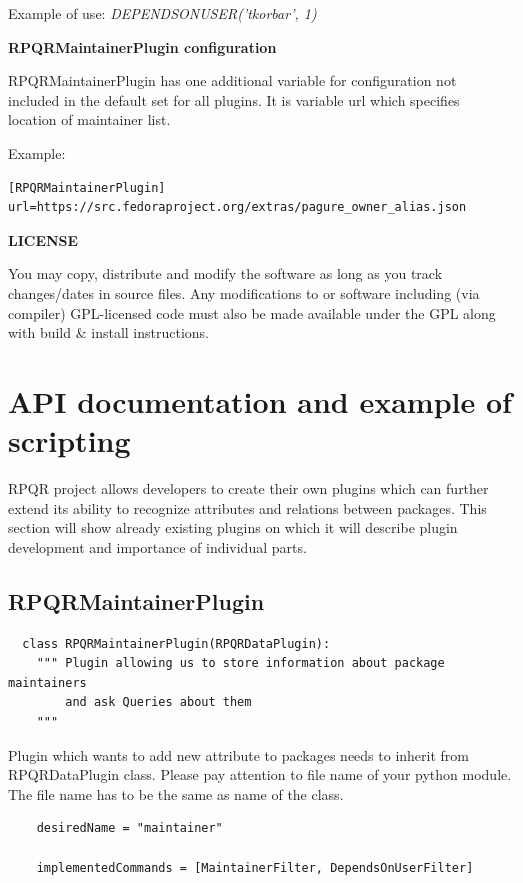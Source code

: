 Example of use: \textit{DEPENDSONUSER('tkorbar', 1)}

\textbf{RPQRMaintainerPlugin configuration}

RPQRMaintainerPlugin has one additional variable for configuration not included in the default set for
all plugins. It is variable url which specifies location of maintainer list.

Example:
\begin{lstlisting}
[RPQRMaintainerPlugin]
url=https://src.fedoraproject.org/extras/pagure_owner_alias.json
\end{lstlisting}

\textbf{LICENSE}

You may copy, distribute and modify the software as long as you track changes/dates in source files.
Any modifications to or software including (via compiler) GPL-licensed code must also be made available
under the GPL along with build \& install instructions.

\section{API documentation and example of scripting}

RPQR project allows developers to create their own plugins which can further extend its ability to
recognize attributes and relations between packages. This section will show already existing plugins
on which it will describe plugin development and importance of individual parts.

\subsection*{RPQRMaintainerPlugin}

\begin{lstlisting}
  class RPQRMaintainerPlugin(RPQRDataPlugin):
    """ Plugin allowing us to store information about package maintainers
        and ask Queries about them
    """
\end{lstlisting}

Plugin which wants to add new attribute to packages needs to inherit from RPQRDataPlugin class.
Please pay attention to file name of your python module. The file name has to be the same as
name of the class.

\begin{lstlisting}
    desiredName = "maintainer"

    implementedCommands = [MaintainerFilter, DependsOnUserFilter]
\end{lstlisting}

